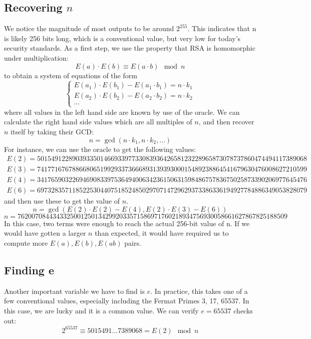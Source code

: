 \documentclass[11pt]{llncs}
\begin{document}
\subsection{Recovering $n$}
We notice the magnitude of most outputs to be around $2^{255}$. This indicates that n  is likely 256 bits long, which is a conventional value, but very low for today's security standards. As a first step, we use the property that RSA is homomorphic under multiplication:
\[ E(a) \cdot E(b) \equiv E(a \cdot b) \mod n \]
to obtain a system of equations of the form
\[ \begin{cases}
E(a_1) \cdot E(b_1) - E(a_1 \cdot b_1) = n \cdot k_1\\
E(a_2) \cdot E(b_2) - E(a_2 \cdot b_2) = n \cdot k_2\\
\cdots
\end{cases} \]
where all values in the left hand side are known by use of the oracle. We can calculate the right hand side values which are all multiples of $n$, and then recover $n$ itself by taking their GCD: \[ n = \gcd(n \cdot k_1, n \cdot k_2, \dots) \]
For instance, we can use the oracle to get the following values: \small
\[ \begin{aligned}
E(2)=50154912289039335014669339773308393642658123228965873078737860474494117389068 \\
E(3)=74177167678866806519929337366689313939300015489238864541679630476008627210599 \\
E(4)=34176590322694690833975364940063423615063159848675783675025873390206977645476 \\
E(6)=69732835711852253044075185248502970714729629373386336194927784886349053828079
\end{aligned} \]
\normalsize and then use these to get the value of $n$.
\[ n = \gcd(E(2)\cdot E(2)-E(4), E(2)\cdot E(3)-E(6)) \]
\small
\[ n = 76200708443433250012501342992033571586971760218934756930058661627867825188509 \]
\normalsize
In this case, two terms were enough to reach the actual 256-bit value of n. If we would have gotten a larger $n$ than expected, it would have required us to compute more $E(a),E(b),E(ab)$ pairs.

\subsection{Finding e}
Another important variable we have to find is $e$. In practice, this takes one of a few conventional values, especially including the Fermat Primes 3, 17, 65537. In this case, we are lucky and it is a common value. We can verify $e=65537$ checks out:
\[ 2^{65537} \equiv 5015491 \dots 7389068 = E(2) \mod n \]
\end{document}
